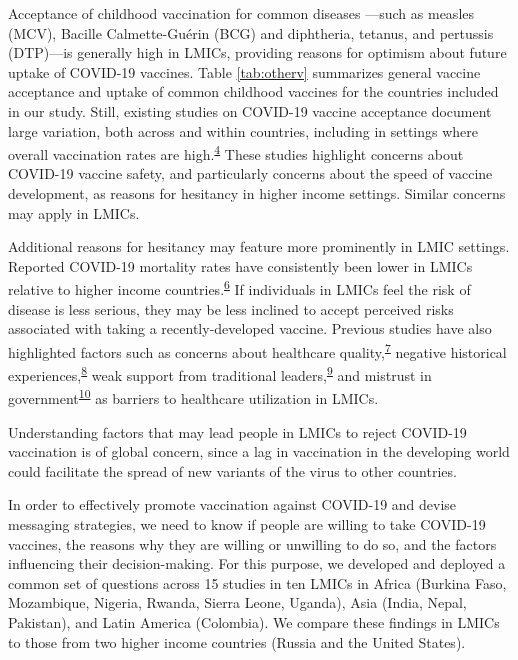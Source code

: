 \documentclass[
  12pt,
]{article}
\begin{document}
Acceptance of childhood vaccination for common diseases ---such as measles (MCV), Bacille Calmette-Guérin (BCG) and diphtheria, tetanus, and pertussis (DTP)---is generally high in LMICs, providing reasons for optimism about future uptake of COVID-19 vaccines. Table \ref{tab:otherv} summarizes general vaccine acceptance and uptake of common childhood vaccines for the countries included in our study. Still, existing studies on COVID-19 vaccine acceptance document large variation, both across and within countries, including in settings where overall vaccination rates are high.\textsuperscript{\protect\hyperlink{ref-boyon2020ipsos}{4}} These studies highlight concerns about COVID-19 vaccine safety, and particularly concerns about the speed of vaccine development, as reasons for hesitancy in higher income settings. Similar concerns may apply in LMICs.

Additional reasons for hesitancy may feature more prominently in LMIC settings. Reported COVID-19 mortality rates have consistently been lower in LMICs relative to higher income countries.\textsuperscript{\protect\hyperlink{ref-mukherjee}{6}} If individuals in LMICs feel the risk of disease is less serious, they may be less inclined to accept perceived risks associated with taking a recently-developed vaccine. Previous studies have also highlighted factors such as concerns about healthcare quality,\textsuperscript{\protect\hyperlink{ref-christensen2020building}{7}} negative historical experiences,\textsuperscript{\protect\hyperlink{ref-Lowes2018}{8}} weak support from traditional leaders,\textsuperscript{\protect\hyperlink{ref-Jegede2007}{9}} and mistrust in government\textsuperscript{\protect\hyperlink{ref-BLAIR201789}{10}} as barriers to healthcare utilization in LMICs.

Understanding factors that may lead people in LMICs to reject COVID-19 vaccination is of global concern, since a lag in vaccination in the developing world could facilitate the spread of new variants of the virus to other countries.

In order to effectively promote vaccination against COVID-19 and devise messaging strategies, we need to know if people are willing to take COVID-19 vaccines, the reasons why they are willing or unwilling to do so, and the factors influencing their decision-making. For this purpose, we developed and deployed a common set of questions across 15 studies in ten LMICs in Africa (Burkina Faso, Mozambique, Nigeria, Rwanda, Sierra Leone, Uganda), Asia (India, Nepal, Pakistan), and Latin America (Colombia). We compare these findings in LMICs to those from two higher income countries (Russia and the United States).
\end{document}
